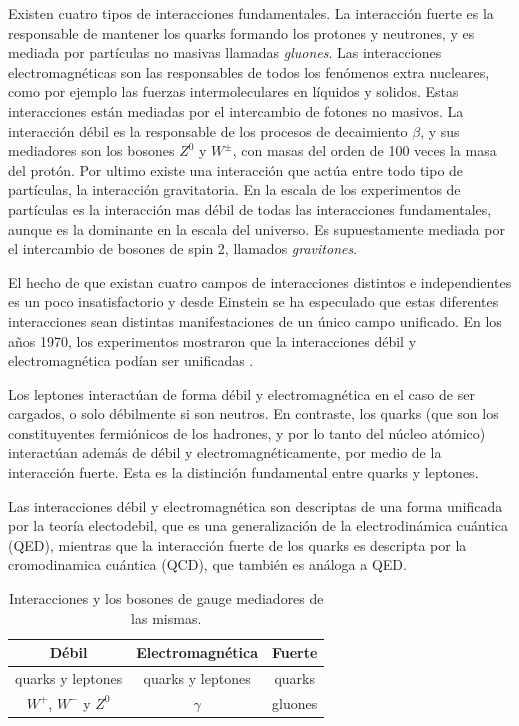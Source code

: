 Existen cuatro tipos de interacciones fundamentales. La interacción fuerte es la responsable
de mantener los quarks formando los protones y neutrones, y es mediada por partículas no masivas
llamadas \emph{gluones}. Las interacciones electromagnéticas son las responsables de todos los
fenómenos extra nucleares, como por ejemplo las fuerzas intermoleculares en líquidos y solidos.
Estas interacciones están mediadas por el intercambio de fotones no masivos.
La interacci\'on débil es la responsable de los procesos de decaimiento $\beta$, y sus mediadores
son los bosones $Z^0$ y $W^\pm$, con masas del orden de 100 veces la masa del protón.
Por ultimo existe una interacción que actúa entre todo tipo de partículas, la interacción gravitatoria.
En la escala de los experimentos de partículas es la interacción mas débil de todas las interacciones
fundamentales, aunque es la dominante en la escala del universo. Es supuestamente mediada por el
intercambio de bosones de spin 2, llamados \emph{gravitones}.

El hecho de que existan cuatro campos de interacciones distintos e independientes es un poco
insatisfactorio y desde Einstein se ha especulado que estas diferentes interacciones sean
distintas manifestaciones de un único campo unificado. En los a\~nos 1970, los experimentos
mostraron que la interacciones débil y electromagnética podían ser unificadas .

Los leptones interact\'uan de forma d\'ebil y electromagn\'etica en el caso de ser cargados,
o solo d\'ebilmente si son neutros. En contraste, los quarks (que son los constituyentes
fermi\'onicos de los hadrones, y por lo tanto del n\'ucleo at\'omico) interact\'uan adem\'as de
d\'ebil y electromagn\'eticamente, por medio de la interacci\'on fuerte. Esta es la distinci\'on
fundamental entre quarks y leptones.

Las interacciones débil y electromagnética son descriptas de una forma unificada por la
teoría electodebil, que es una generalización de la electrodinámica cuántica (QED), mientras
que la interacción fuerte de los quarks es descripta por la cromodinamica cuántica (QCD), que
también es análoga a QED.

\begin{table}[!ht]
\centering
\begin{tabular}{ccc}
\hline Débil & Electromagnética & Fuerte \\
\hline quarks y leptones & quarks y leptones & quarks \\
\hline $W^+$, $W^-$ y $Z^0$ & $\gamma$ & gluones \\
\hline
\end{tabular}

\caption{Interacciones y los bosones de gauge mediadores de las mismas.}\label{tab:bosons}
\end{table}

